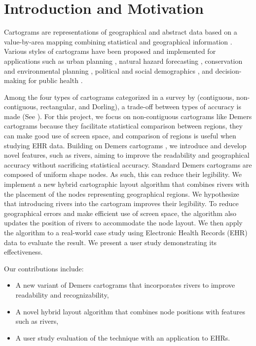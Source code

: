 \section{Introduction and Motivation}

Cartograms are representations of geographical and abstract data based on a value-by-area mapping combining statistical and geographical information \cite{dent2009Cartography}. Various styles of cartograms have been proposed and implemented for applications such as urban planning \cite{harris2018Mapping, arranz-lopez2021Enduser}, natural hazard forecasting \cite{pappenberger2019Cartograms, park2020Flood}, conservation and environmental planning \cite{galluzzi2018Mapping, rocchini2019Cartogramming}, political and social demographics \cite{breitzman2018Using, alieva2021How}, and decision-making for public health \cite{gao2020Visualising, sack2021Visualizing}.

Among the four types of cartograms categorized in a survey by  (contiguous, non-contiguous, rectangular, and Dorling), a trade-off between types of accuracy is made (See ). For this project, we focus on non-contiguous cartograms like Demers cartograms because they facilitate statistical comparison between regions, they can make good use of screen space, and comparison of regions is useful when studying EHR data. Building on Demers cartograms \cite{ian2002Cartogram}, we introduce and develop novel features, such as rivers, aiming to improve the readability and geographical accuracy without sacrificing statistical accuracy. Standard Demers cartograms are composed of uniform shape nodes. As such, this can reduce their legibility. We implement a new hybrid cartographic layout algorithm that combines rivers with the placement of the nodes representing geographical regions. We hypothesize that introducing rivers into the cartogram improves their legibility. To reduce geographical errors and make efficient use of screen space, the algorithm also updates the position of rivers to accommodate the node layout. We then apply the algorithm to a real-world case study using Electronic Health Records (EHR) data to evaluate the result. We present a user study demonstrating its effectiveness.

Our contributions include:

\begin{itemize}
    \item A new variant of Demers cartograms that incorporates rivers to improve readability and recognizability,
    \item A novel hybrid layout algorithm that combines node positions with features such as rivers,
    \item A user study evaluation of the technique with an application to EHRs.
\end{itemize}

